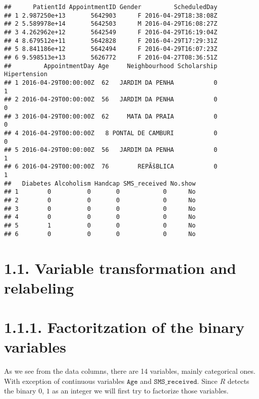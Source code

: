 \documentclass[]{article}
\begin{document}
\begin{verbatim}
##      PatientId AppointmentID Gender         ScheduledDay
## 1 2.987250e+13       5642903      F 2016-04-29T18:38:08Z
## 2 5.589978e+14       5642503      M 2016-04-29T16:08:27Z
## 3 4.262962e+12       5642549      F 2016-04-29T16:19:04Z
## 4 8.679512e+11       5642828      F 2016-04-29T17:29:31Z
## 5 8.841186e+12       5642494      F 2016-04-29T16:07:23Z
## 6 9.598513e+13       5626772      F 2016-04-27T08:36:51Z
##         AppointmentDay Age     Neighbourhood Scholarship Hipertension
## 1 2016-04-29T00:00:00Z  62   JARDIM DA PENHA           0            1
## 2 2016-04-29T00:00:00Z  56   JARDIM DA PENHA           0            0
## 3 2016-04-29T00:00:00Z  62     MATA DA PRAIA           0            0
## 4 2016-04-29T00:00:00Z   8 PONTAL DE CAMBURI           0            0
## 5 2016-04-29T00:00:00Z  56   JARDIM DA PENHA           0            1
## 6 2016-04-29T00:00:00Z  76        REPÃšBLICA           0            1
##   Diabetes Alcoholism Handcap SMS_received No.show
## 1        0          0       0            0      No
## 2        0          0       0            0      No
## 3        0          0       0            0      No
## 4        0          0       0            0      No
## 5        1          0       0            0      No
## 6        0          0       0            0      No
\end{verbatim}

\section{1.1. Variable transformation and
relabeling}\label{variable-transformation-and-relabeling}

\section{1.1.1. Factoritzation of the binary
variables}\label{factoritzation-of-the-binary-variables}

As we see from the data columns, there are 14 variables, mainly
categorical ones. With exception of continuous variables
\(\texttt{Age}\) and \(\texttt{SMS_received}\). Since \(R\) detects the
binary \(0\), \(1\) as an integer we will first try to factorize those
variables.
\end{document}
